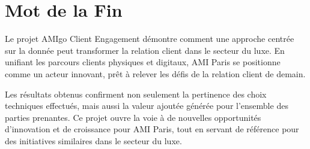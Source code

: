 \section{Mot de la Fin}

Le projet AMIgo Client Engagement démontre comment une approche centrée sur la donnée peut transformer la relation client dans le secteur du luxe. En unifiant les parcours clients physiques et digitaux, AMI Paris se positionne comme un acteur innovant, prêt à relever les défis de la relation client de demain.

Les résultats obtenus confirment non seulement la pertinence des choix techniques effectués, mais aussi la valeur ajoutée générée pour l'ensemble des parties prenantes. Ce projet ouvre la voie à de nouvelles opportunités d'innovation et de croissance pour AMI Paris, tout en servant de référence pour des initiatives similaires dans le secteur du luxe.

